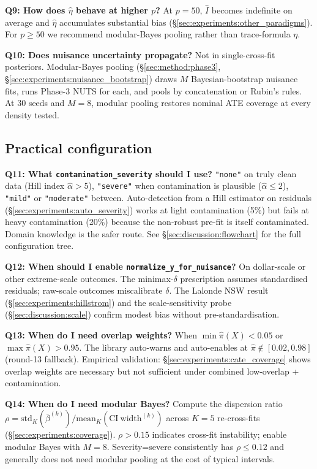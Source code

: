\textbf{Q9: How does $\widehat\eta$ behave at higher $p$?}
At $p = 50$, $\widehat I$ becomes indefinite on average and
$\widehat\eta$ accumulates substantial bias
(\S\ref{sec:experiments:other_paradigms}). For $p \ge 50$ we recommend
modular-Bayes pooling rather than trace-formula $\eta$.

\textbf{Q10: Does nuisance uncertainty propagate?}
Not in single-cross-fit posteriors. Modular-Bayes pooling
(\S\ref{sec:method:phase3}, \S\ref{sec:experiments:nuisance_bootstrap})
draws $M$ Bayesian-bootstrap nuisance fits, runs Phase-3 NUTS for
each, and pools by concatenation or Rubin's rules. At 30 seeds and
$M = 8$, modular pooling restores nominal ATE coverage at every
density tested.

\subsection{Practical configuration}

\textbf{Q11: What \texttt{contamination\_severity} should I use?}
\texttt{"none"} on truly clean data (Hill index $\hat\alpha > 5$),
\texttt{"severe"} when contamination is plausible
($\hat\alpha \le 2$), \texttt{"mild"} or \texttt{"moderate"} between.
Auto-detection from a Hill estimator on residuals
(\S\ref{sec:experiments:auto_severity}) works at light contamination
(5\%) but fails at heavy contamination (20\%) because the non-robust
pre-fit is itself contaminated. Domain knowledge is the safer route.
See \S\ref{sec:discussion:flowchart} for the full configuration tree.

\textbf{Q12: When should I enable \texttt{normalize\_y\_for\_nuisance}?}
On dollar-scale or other extreme-scale outcomes. The minimax-$\delta$
prescription assumes standardised residuals; raw-scale outcomes
miscalibrate $\delta$. The Lalonde NSW result
(\S\ref{sec:experiments:hillstrom}) and the scale-sensitivity probe
(\S\ref{sec:discussion:scale}) confirm modest bias without
pre-standardisation.

\textbf{Q13: When do I need overlap weights?}
When $\min \hat\pi(X) < 0.05$ or $\max \hat\pi(X) > 0.95$. The
library auto-warns and auto-enables at $\hat\pi \notin [0.02, 0.98]$
(round-13 fallback). Empirical validation:
\S\ref{sec:experiments:cate_coverage} shows overlap weights are
necessary but not sufficient under combined low-overlap +
contamination.

\textbf{Q14: When do I need modular Bayes?}
Compute the dispersion ratio $\rho = \mathrm{std}_K(\bar\beta^{(k)}) / \mathrm{mean}_K(\mathrm{CI~width}^{(k)})$
across $K = 5$ re-cross-fits (\S\ref{sec:experiments:coverage}).
$\rho > 0.15$ indicates cross-fit instability; enable modular Bayes
with $M = 8$. Severity=severe consistently has $\rho \le 0.12$ and
generally does not need modular pooling at the cost of typical
intervals.

